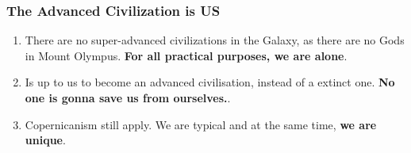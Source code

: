 \begin{frame}

\frametitle{ The Advanced Civilization is US}

\begin{enumerate}

\item  There are no super-advanced civilizations in the Galaxy, as there are no Gods in Mount Olympus. {\bf For all practical purposes, we are alone}.
\item Is up to us to become an advanced civilisation, instead of a extinct one. {\bf No one is gonna save us from ourselves.}.
\item Copernicanism still apply. We are typical and at the same time, {\bf we are unique}.
\end{enumerate}
\end{frame}

